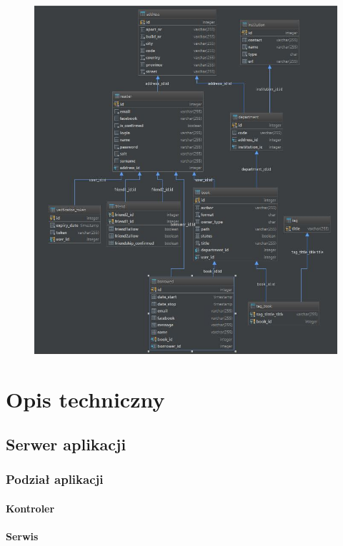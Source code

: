 \documentclass{report}
\begin{document}
			\begin{figure}[!htb]
				\centering
				\includegraphics[width=1.\textwidth]{bookaDB.jpg}
			\end{figure}

\chapter{Opis techniczny}

	\section{Serwer aplikacji}
	
		\subsection{Podział aplikacji}
			
			\subsubsection{Kontroler}
			
			\subsubsection{Serwis}
			
\end{document}
